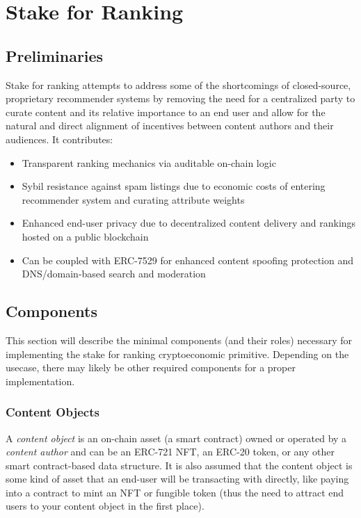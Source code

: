 \section{Stake for Ranking} 
\label{section:ProtocolDescription}

\subsection{Preliminaries}
Stake for ranking attempts to address some of the shortcomings of closed-source, proprietary recommender systems by removing the need for a centralized party to curate content and its relative importance to an end user and allow for the natural and direct alignment of incentives between content authors and their audiences. It contributes:
\begin{itemize}
    \item Transparent ranking mechanics via auditable on-chain logic
    \item Sybil resistance against spam listings due to economic costs of entering recommender system and curating attribute weights
    \item Enhanced end-user privacy due to decentralized content delivery and rankings hosted on a public blockchain
    \item Can be coupled with ERC-7529 \cite{chapman2023erc7529} for enhanced content spoofing protection and DNS/domain-based search and moderation
\end{itemize}

\subsection{Components}
\label{Components}

This section will describe the minimal components (and their roles) necessary for implementing the stake for ranking cryptoeconomic primitive. Depending on the usecase, there may likely be other required components for a proper implementation. 

\subsubsection{Content Objects}
\label{ContentObjectDefinition}

A \textit{content object} is an on-chain asset (a smart contract) owned or operated by a \textit{content author} and can be an ERC-721 NFT, an ERC-20 token, or any other smart contract-based data structure. It is also assumed that the content object is some kind of asset that an end-user will be transacting with directly, like paying into a contract to mint an NFT or fungible token (thus the need to attract end users to your content object in the first place). 

